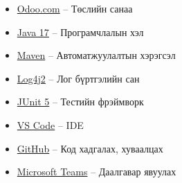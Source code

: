 \documentclass[12pt]{article}
\begin{document}
\begin{itemize}
    \item \href{https://www.odoo.com}{Odoo.com} – Төслийн санаа
    \item \href{https://www.oracle.com/java/technologies/javase/jdk17-archive-downloads.html}{Java 17} – Програмчлалын хэл
    \item \href{https://maven.apache.org}{Maven} – Автоматжуулалтын хэрэгсэл
    \item \href{https://logging.apache.org/log4j/2.x/}{Log4j2} – Лог бүртгэлийн сан
    \item \href{https://junit.org/junit5/}{JUnit 5} – Тестийн фрэймворк
    \item \href{https://code.visualstudio.com}{VS Code} – IDE
    \item \href{https://github.com}{GitHub} – Код хадгалах, хуваалцах
    \item \href{https://www.microsoft.com/en-us/microsoft-teams/group-chat-software}{Microsoft Teams} – Даалгавар явуулах
\end{itemize}
\end{document}
